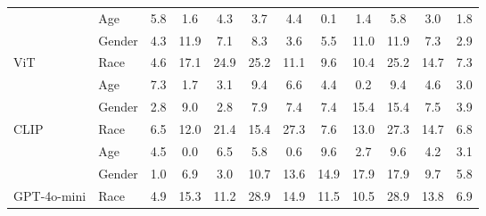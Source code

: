 \begin{table}[b]
{\begin{tabular}{ll|>{\color{mediumgray}}c>{\color{mediumgray}}c>{\color{mediumgray}}c>{\color{mediumgray}}c>{\color{mediumgray}}c>{\color{mediumgray}}c>{\color{mediumgray}}c|ccc}
\multicolumn{1}{l|}{}                               & Age    & 5.8 & 1.6 & 4.3 & 3.7 & 4.4 & 0.1 & 1.4 & 5.8 & 3.0 & 1.8 \\
\multicolumn{1}{l|}{}                               & Gender & 4.3 & 11.9 & 7.1 & 8.3 & 3.6 & 5.5 & 11.0 & 11.9 & 7.3 & 2.9 \\
\multicolumn{1}{l|}{\multirow{-3}{*}{ViT}}          & Race   & 4.6 & 17.1 & 24.9 & 25.2 & 11.1 & 9.6 & 10.4 & 25.2 & 14.7 & 7.3 \\ \hline
\multicolumn{1}{l|}{}                               & Age    & 7.3 & 1.7 & 3.1 & 9.4 & 6.6 & 4.4 & 0.2 & 9.4 & 4.6 & 3.0 \\
\multicolumn{1}{l|}{}                               & Gender & 2.8 & 9.0 & 2.8 & 7.9 & 7.4 & 7.4 & 15.4 & 15.4 & 7.5 & 3.9 \\
\multicolumn{1}{l|}{\multirow{-3}{*}{CLIP}}         & Race   & 6.5 & 12.0 & 21.4 & 15.4 & 27.3 & 7.6 & 13.0 & 27.3 & 14.7 & 6.8 \\ \hline
\multicolumn{1}{l|}{}                               & Age    & 4.5 & 0.0 & 6.5 & 5.8 & 0.6 & 9.6 & 2.7 & 9.6 & 4.2 & 3.1 \\
\multicolumn{1}{l|}{}                               & Gender & 1.0 & 6.9 & 3.0 & 10.7 & 13.6 & 14.9 & 17.9 & 17.9 & 9.7 & 5.8 \\
\multicolumn{1}{l|}{\multirow{-3}{*}{GPT-4o-mini}}  & Race   & 4.9 & 15.3 & 11.2 & 28.9 & 14.9 & 11.5 & 10.5 & 28.9 & 13.8 & 6.9 \\ \hline
\end{tabular}
}
\end{table}



